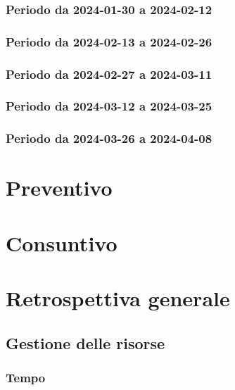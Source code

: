 \documentclass[10pt, a4paper]{article}
\begin{document}
{{{{{{\subsubsection{Periodo da 2024-01-30 a 2024-02-12}



\subsubsection{Periodo da 2024-02-13 a 2024-02-26}



\subsubsection{Periodo da 2024-02-27 a 2024-03-11}


\subsubsection{Periodo da 2024-03-12 a 2024-03-25}



\subsubsection{Periodo da 2024-03-26 a 2024-04-08}



\section{Preventivo}





\section{Consuntivo}

\section{Retrospettiva generale}
\subsection{Gestione delle risorse}
\subsubsection{Tempo}
}}}}}}
\end{document}
